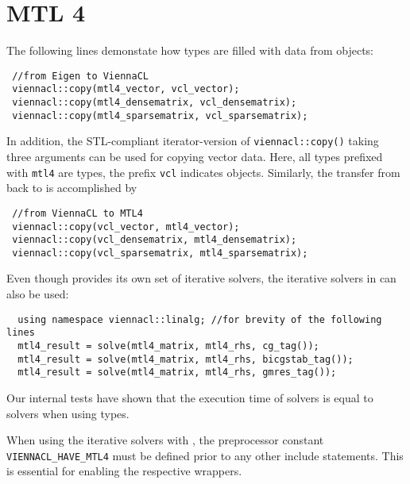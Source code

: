 \section{MTL 4}
The following lines demonstate how {\ViennaCL} types are filled with data from {\MTL} \cite{mtl4} objects:
\begin{lstlisting}
 //from Eigen to ViennaCL
 viennacl::copy(mtl4_vector, vcl_vector);
 viennacl::copy(mtl4_densematrix, vcl_densematrix);
 viennacl::copy(mtl4_sparsematrix, vcl_sparsematrix);
\end{lstlisting}
In addition, the STL-compliant iterator-version of \texttt{viennacl::copy()} taking three arguments can be used for copying vector data.
Here, all types prefixed with \texttt{mtl4} are {\MTL} types, the prefix \texttt{vcl} indicates {\ViennaCL} objects.
Similarly, the transfer from {\ViennaCL} back to {\MTL} is accomplished by
\begin{lstlisting}
 //from ViennaCL to MTL4
 viennacl::copy(vcl_vector, mtl4_vector);
 viennacl::copy(vcl_densematrix, mtl4_densematrix);
 viennacl::copy(vcl_sparsematrix, mtl4_sparsematrix);
\end{lstlisting}

Even though {\MTL} provides its own set of iterative solvers, the iterative solvers in {\ViennaCL} can also be used:
\begin{lstlisting}
  using namespace viennacl::linalg; //for brevity of the following lines
  mtl4_result = solve(mtl4_matrix, mtl4_rhs, cg_tag());
  mtl4_result = solve(mtl4_matrix, mtl4_rhs, bicgstab_tag());
  mtl4_result = solve(mtl4_matrix, mtl4_rhs, gmres_tag());
\end{lstlisting}
Our internal tests have shown that the execution time of {\MTL} solvers is equal to {\ViennaCL} solvers when using {\MTL} types.

When using the iterative solvers with {\MTL}, the preprocessor constant \texttt{VIENNACL\_HAVE\_MTL4} must be defined prior to any other {\ViennaCL} include statements.
This is essential for enabling the respective wrappers.

